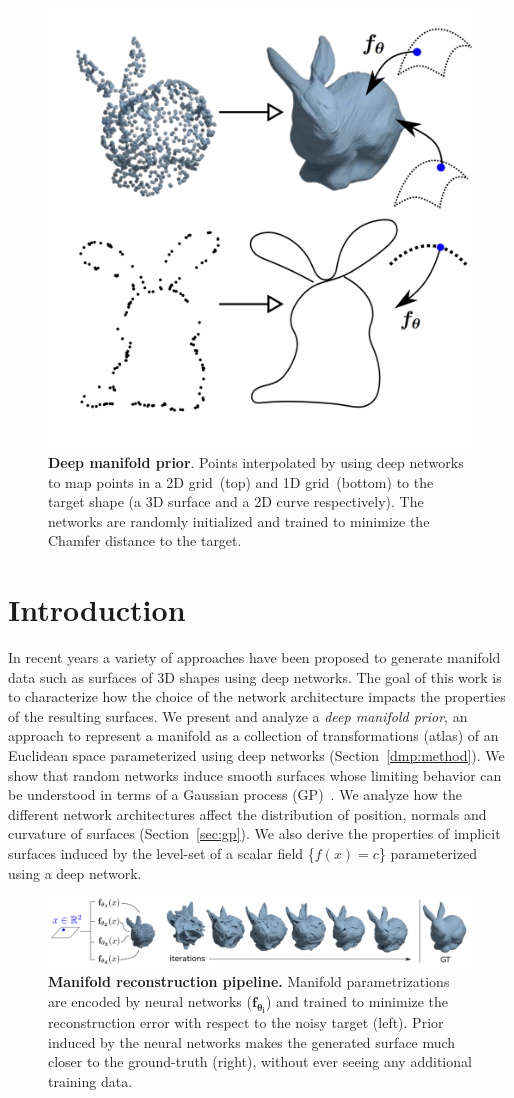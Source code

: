 \begin{figure}
\centering
\includegraphics[width=0.5\linewidth]{dmp/imgs/visabstract.pdf}
\caption{\label{fig:visabstract}\small
\textbf{Deep manifold prior}. Points interpolated by using deep networks to map points in a 2D grid~(top) and 1D grid~(bottom) to the target shape (a 3D surface and a 2D curve respectively). The networks are randomly initialized and trained to minimize the Chamfer distance to the target.}
\end{figure}

\section{Introduction}

In recent years a variety of approaches have been proposed to generate manifold data such
as surfaces of 3D shapes using deep networks.
The goal of this work is to characterize how the choice of the network architecture
impacts the properties of the resulting surfaces.
We present and analyze a \emph{deep manifold prior}, an approach to represent a
manifold as a collection of transformations (atlas) of an
Euclidean space parameterized using deep networks (Section~\ref{dmp:method}).
We show that random networks induce smooth surfaces whose limiting
behavior can be understood in terms of a Gaussian process
(GP)~\cite{Neal,williams1997computing, cho2009kernel}.
We analyze how the different network architectures affect the
distribution of position, normals and
curvature of surfaces (Section~\ref{sec:gp}).
We also derive the properties of implicit surfaces 
induced by the level-set of a scalar field \{$f(x) = c$\} parameterized
using a deep network.


\begin{figure}[ht]
\centering
\includegraphics[width=\linewidth]{dmp/imgs/iters.png}
    \caption{\label{fig:pipeline} \small \textbf{Manifold reconstruction pipeline.}
    Manifold parametrizations are encoded by neural networks ($\mathbf{f_{\theta_i}}$)
    and trained to minimize the reconstruction error with respect to the noisy target
    (left).
    Prior induced by the neural networks makes the generated surface much closer to
    the ground-truth (right), without ever seeing any additional training data.
}
\end{figure}

